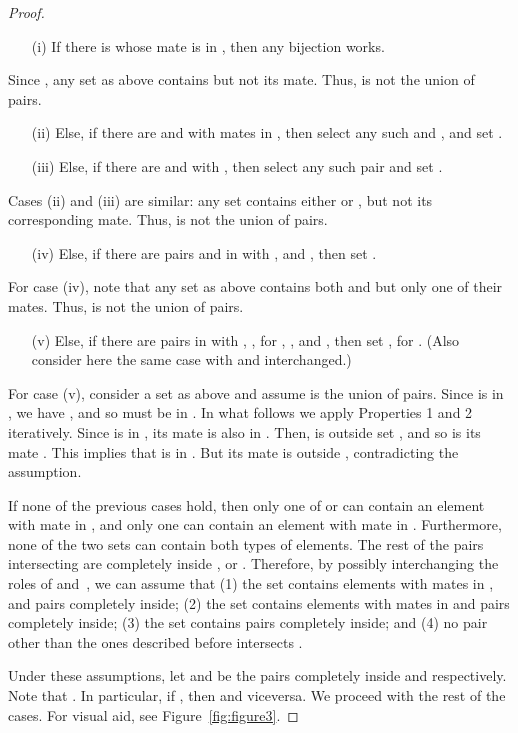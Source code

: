\documentclass[letterpaper,11pt]{article}
\theoremstyle{definition}
\begin{document}
\begin{proof}
\begin{enumerate}
\item[(i)] If there is  whose mate is in , then any bijection  works.
\end{enumerate}
Since , any set  as above contains  but not its mate. Thus,  is not the union of  pairs.
\begin{enumerate}
  \item[(ii)] Else, if there are  and  with mates in , then select any such  and , and set .
  \item[(iii)] Else, if there are  and  with , then select any such pair and set .
\end{enumerate}
Cases (ii) and (iii) are similar: any set  contains either  or , but not its corresponding mate. Thus,  is not the union of  pairs.
\begin{enumerate}
\item[(iv)]\label{iv} Else, if there are pairs  and  in  with ,  and , then set .
\end{enumerate}
For case (iv), note that any set  as above contains both  and  but only one of their mates. Thus,   is not the union of  pairs.
\begin{enumerate}
\item[(v)] Else, if there are pairs  in  with , , for ,  , and , then set , for . (Also consider here the same case with  and  interchanged.)
\end{enumerate}
For case (v), consider a set  as above and assume  is the union of  pairs. Since  is in , we have , and so  must be in . In what follows we apply Properties 1 and 2 iteratively. Since  is in , its mate  is also in . Then,  is outside set , and so is its mate . This implies that  is in . But its mate  is outside , contradicting the assumption.

If none of the previous cases hold, then only one of  or  can contain an element with mate in , and  only one  can contain an element with mate in . Furthermore, none of the two sets can contain both types of elements. The rest of the pairs intersecting  are completely inside ,  or . Therefore, by possibly interchanging the roles of  and~, we can assume that (1) the set  contains  elements with mates in , and  pairs completely inside; (2) the set  contains  elements with mates in  and  pairs completely inside; (3) the set  contains  pairs completely inside; and (4) no pair other than the ones described before intersects .

Under these assumptions, let  and  be the pairs completely inside  and  respectively. Note that . In particular, if , then   and viceversa. We proceed with the rest of the cases. For visual aid, see Figure~\ref{fig:figure3}.


\end{proof}
\end{document}
